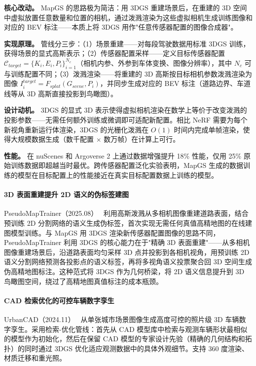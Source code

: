 \textbf{核心改动。} MapGS 的思路极为简洁：用 3DGS 重建场景后，在重建的 3D 空间中虚拟放置任意数量和位置的相机，通过泼溅渲染为这些虚拟相机生成训练图像和对应的 BEV 标注——本质上将 3DGS 用作"任意传感器配置的图像合成器"。

\textbf{实现原理。} 管线分三步：（1）场景重建——对每段驾驶数据用标准 3DGS 训练，获得场景的显式高斯表示；（2）传感器配置采样——定义目标传感器配置 $\mathcal{C}_{target} = \{K_i, E_i, P_i\}_{i=1}^{N_c}$（相机内参、外参到车体变换、图像分辨率），其中 $N_c$ 可与训练配置不同；（3）泼溅渲染——将重建的 3D 高斯按目标相机参数泼溅渲染为图像 $I_i^{target} = F_{splat}(G_{scene}, P_i)$，并同步生成对应的 BEV 标注（道路边界、车道线等从 3D 高斯直接投影到鸟瞰图）。

\textbf{设计动机。} 3DGS 的显式 3D 表示使得虚拟相机渲染在数学上等价于改变泼溅的投影参数——无需任何额外训练或微调即可适配新配置。相比 NeRF 需要为每个新视角重新运行体渲染，3DGS 的光栅化泼溅在 $O(1)$ 时间内完成单帧渲染，使得大规模数据生成（数千配置 $\times$ 数万帧）在计算上可行。

\textbf{性能。} 在 nuScenes 和 Argoverse 2 上通过数据增强提升 18\% 性能，仅用 25\% 原始训练数据即超越当时最优。跨传感器配置泛化实验表明，MapGS 生成的数据训练的模型在目标配置上的性能接近在真实目标配置数据上训练的模型。

\paragraph{3D 表面重建提升 2D 语义的伪标签建图}

PseudoMapTrainer（2025.08）~\cite{2508_18788} 利用高斯泼溅从多相机图像重建道路表面，结合预训练 2D 分割网络的语义生成伪标签，首次实现无需任何真值高精地图的在线建图模型训练。与 MapGS 用 3DGS 渲染新传感器配置图像的思路不同，PseudoMapTrainer 利用 3DGS 的核心能力在于"精确 3D 表面重建"——从多相机图像重建场景后，沿道路表面均匀采样 3D 点并投影到各相机视角，用预训练 2D 语义分割网络预测各投影点的语义标签，再将多视角语义投票聚合回 3D 空间生成伪高精地图标注。这种范式将 3DGS 作为几何桥梁，将 2D 语义信息提升到 3D 鸟瞰图空间，绕过了高精地图真值标注的成本瓶颈。

\paragraph{CAD 检索优化的可控车辆数字孪生}

UrbanCAD（2024.11）~\cite{2411_19292} 从单张城市场景图像生成高度可控的照片级 3D 车辆数字孪生。采用检索-优化管线：首先从 CAD 模型库中检索与观测车辆形状最相似的模型作为初始化，然后在保留 CAD 模型的专家设计先验（精确的几何结构和拓扑）的同时通过 3DGS 优化适应观测数据中的具体外观细节。支持 360 度渲染、材质迁移和重光照。

